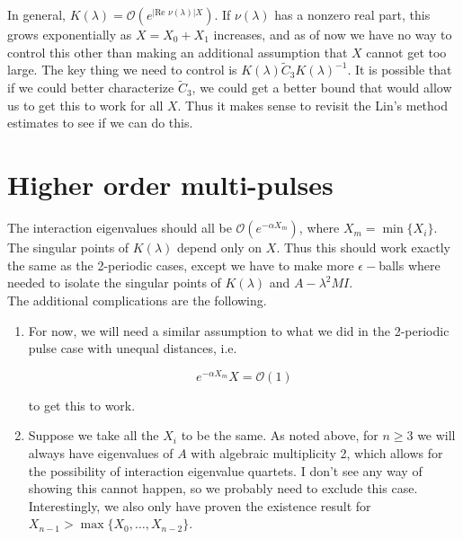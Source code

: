 \documentclass[12pt]{article}
\begin{document}
In general, $K(\lambda) = \mathcal{O}(e^{|\text{Re } \nu(\lambda)|X})$. If $\nu(\lambda)$ has a nonzero real part, this grows exponentially as $X = X_0 + X_1$ increases, and as of now we have no way to control this other than making an additional assumption that $X$ cannot get too large. The key thing we need to control is $K(\lambda) \tilde{C}_3 K(\lambda)^{-1}$. It is possible that if we could better characterize $\tilde{C}_3$, we could get a better bound that would allow us to get this to work for all $X$. Thus it makes sense to revisit the Lin's method estimates to see if we can do this.    

\section{Higher order multi-pulses}

The interaction eigenvalues should all be $\mathcal{O}(e^{-\alpha X_m})$, where $X_m = \min \{X_i\}$. The singular points of $K(\lambda)$ depend only on $X$. Thus this should work exactly the same as the 2-periodic cases, except we have to make more $\epsilon-$balls where needed to isolate the singular points of $K(\lambda)$ and $A - \lambda^2 M I$.\\

The additional complications are the following.

\begin{enumerate}

\item For now, we will need a similar assumption to what we did in the 2-periodic pulse case with unequal distances, i.e. 

\[
e^{-\alpha X_m}X = \mathcal{O}(1)
\]

to get this to work.

\item Suppose we take all the $X_i$ to be the same. As noted above, for $n \geq 3$ we will always have eigenvalues of $A$ with algebraic multiplicity 2, which allows for the possibility of interaction eigenvalue quartets. I don't see any way of showing this cannot happen, so we probably need to exclude this case. Interestingly, we also only have proven the existence result for $X_{n-1} > \max\{ X_0, \dots, X_{n-2} \}$.

\end{enumerate}
\end{document}
